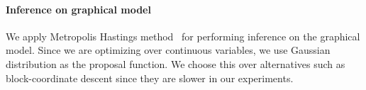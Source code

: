 

%



\vspace{-0.3cm}
\paragraph{Inference on graphical model}
We apply Metropolis Hastings method~\cite{mackay1998introduction} for performing inference on the graphical model. Since we are optimizing over continuous variables, we use Gaussian distribution as the proposal function. We choose this over alternatives such as block-coordinate descent since they are slower in our experiments.


